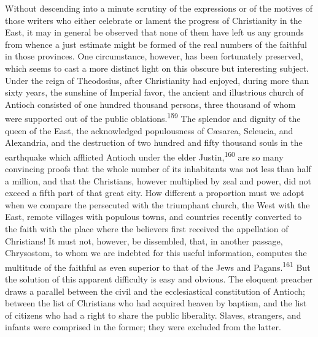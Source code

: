 Without descending into a minute scrutiny of the expressions or
of the motives of those writers who either celebrate or lament
the progress of Christianity in the East, it may in general be
observed that none of them have left us any grounds from whence a
just estimate might be formed of the real numbers of the faithful
in those provinces. One circumstance, however, has been
fortunately preserved, which seems to cast a more distinct light
on this obscure but interesting subject. Under the reign of
Theodosius, after Christianity had enjoyed, during more than
sixty years, the sunshine of Imperial favor, the ancient and
illustrious church of Antioch consisted of one hundred thousand
persons, three thousand of whom were supported out of the public
oblations.\textsuperscript{159} The splendor and dignity of the queen of the East,
the acknowledged populousness of Cæsarea, Seleucia, and
Alexandria, and the destruction of two hundred and fifty thousand
souls in the earthquake which afflicted Antioch under the elder
Justin,\textsuperscript{160} are so many convincing proofs that the whole number
of its inhabitants was not less than half a million, and that the
Christians, however multiplied by zeal and power, did not exceed
a fifth part of that great city. How different a proportion must
we adopt when we compare the persecuted with the triumphant
church, the West with the East, remote villages with populous
towns, and countries recently converted to the faith with the
place where the believers first received the appellation of
Christians! It must not, however, be dissembled, that, in another
passage, Chrysostom, to whom we are indebted for this useful
information, computes the multitude of the faithful as even
superior to that of the Jews and Pagans.\textsuperscript{161} But the solution of
this apparent difficulty is easy and obvious. The eloquent
preacher draws a parallel between the civil and the
ecclesiastical constitution of Antioch; between the list of
Christians who had acquired heaven by baptism, and the list of
citizens who had a right to share the public liberality. Slaves,
strangers, and infants were comprised in the former; they were
excluded from the latter.




